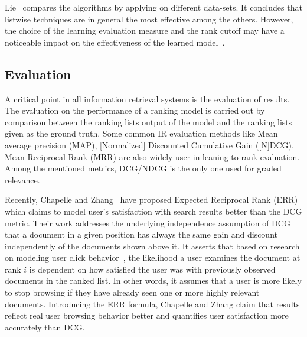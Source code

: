 Lie~\cite{l2r-book} compares the algorithms by applying on different data-sets. It concludes that listwise techniques are in general the most effective among the others. However, the choice of the learning evaluation measure and the rank cutoff may have a noticeable impact on the effectiveness of the learned model~\cite{l2r-when}.

\subsection{Evaluation}

A critical point in all information retrieval systems is the evaluation of results. The evaluation on the performance of a ranking model is carried out by comparison between the ranking lists output of the model and the ranking lists given as the ground truth. Some common IR evaluation methods like Mean average precision (MAP), [Normalized] Discounted Cumulative Gain ([N]DCG), Mean Reciprocal Rank (MRR) are also widely user in leaning to rank evaluation. Among the mentioned metrics, DCG/NDCG is the only one used for graded relevance.

Recently, Chapelle and Zhang~\cite{l2r-err} have proposed Expected Reciprocal Rank (ERR) which claims to model user's satisfaction with search results better than the DCG metric. Their work addresses the underlying independence assumption of DCG that a document in a given position has always the same gain and discount independently of the documents shown above it. It asserts that based on research on modeling user click behavior~\cite{l2r-clickmodel1,l2r-clickmodel2}, the likelihood a user examines the document at rank $i$ is dependent on how satisfied the user was with previously observed documents in the ranked list. In other words, it assumes that a user is more likely to stop browsing if they have already seen one or more highly relevant documents. Introducing the ERR formula, Chapelle and Zhang claim that results reflect real user browsing behavior better and quantifies user satisfaction more accurately than DCG.

